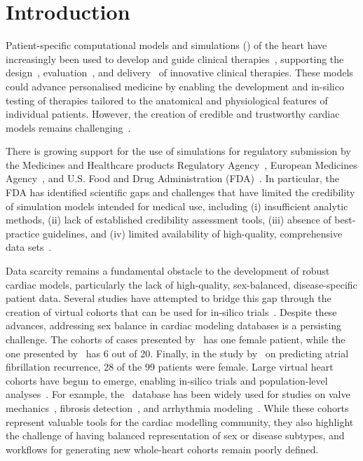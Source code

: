 \section{Introduction}

Patient-specific computational models and simulations (\CMnS) of the heart have increasingly  
been used to develop and guide clinical therapies~\cite{solis-lemus2023_reproducibility},
supporting the  
design~\cite{gray-2018-models_design,vanderlaan-2024-models_design}, 
evaluation~\cite{niederer-2019-models_evaluation,sung-2024-models_evaluation}, 
and delivery~\cite{lee-2018-models_delivery,dokuchaev-2023-models_delivery}
of innovative clinical therapies.
These models could advance personalised medicine by enabling the development and 
in-silico testing of therapies tailored to the anatomical and physiological features of individual patients.
However, the creation of credible and trustworthy cardiac models remains 
challenging~\cite{pras2018-intro-regulatory,jaffery-2024-review}.

There is growing support for the use of simulations for regulatory submission by the 
Medicines and Healthcare products Regulatory Agency~\cite{shepard-2015-mhra}, 
European Medicines Agency~\cite{ema2025_web}, and 
U.S. Food and Drug Administration (FDA)~\cite{jaffery-2024-review,fda2023_web}.
In particular, the FDA has identified scientific gaps and challenges that have limited 
the credibility of simulation models intended for medical use, including
(i) insufficient analytic methods, 
(ii) lack of established credibility assessment tools, 
(iii) absence of best-practice guidelines, and 
(iv) limited availability of high-quality, comprehensive data sets~\cite{fda2023_web}.

Data scarcity remains a fundamental obstacle to the development of robust cardiac models,
particularly the lack of high-quality, sex-balanced, disease-specific patient data. 
Several studies have attempted to bridge this gap through the creation of virtual cohorts that can 
be used for in-silico trials~\cite{strocchi2020_cohort,rodero2021_linking}.
Despite these advances, addressing sex balance in cardiac modeling databases is a persisting challenge. 
The cohorts of cases presented by~\cite{strocchi2020_cohort} has one female patient, 
while the one presented by~\cite{rodero2021_linking} has 6 out of 20. 
Finally, in the study by~\cite{Roney2022-predicting} on predicting atrial fibrillation recurrence, 
28 of the 99 patients were female.
Large virtual heart cohorts have begun to emerge, enabling in-silico trials and population-level 
analyses~\cite{passini2021_virtual,rodero-2021-virtualcohort1000,rodero-2021-virtualcohortextreme}. 
For example, the~\cite{strocchi2020_cohort} database has been widely used for studies on valve 
mechanics~\cite{feng2024_db_user}, 
fibrosis detection~\cite{okenov2024_db_user}, and 
arrhythmia modeling~\cite{kaboudian2023_db_user}.
While these cohorts represent valuable tools for the cardiac modelling community, 
they also highlight the challenge of having balanced representation of sex or disease subtypes, and 
workflows for generating new whole-heart cohorts remain poorly defined.

